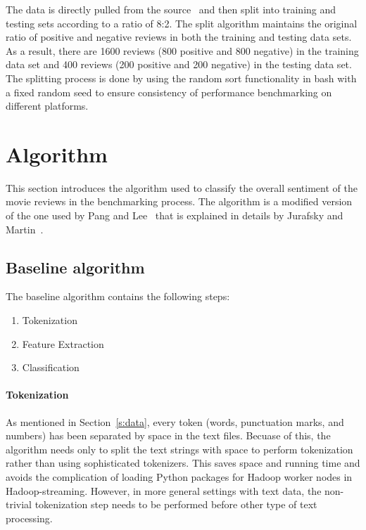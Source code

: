 The data is directly pulled from the
source~\cite{hid-sp18-405-sentiment-data} and then split into training
and testing sets according to a ratio of 8:2. The split algorithm
maintains the original ratio of positive and negative reviews in both
the training and testing data sets. As a result, there are 1600
reviews (800 positive and 800 negative) in the training data set and
400 reviews (200 positive and 200 negative) in the testing data
set. The splitting process is done by using the random sort
functionality in bash with a fixed random seed to ensure consistency
of performance benchmarking on different platforms.


\section{Algorithm}\label{s:algorithm}

This section introduces the algorithm used to classify the overall
sentiment of the movie reviews in the benchmarking process. The
algorithm is a modified version of the one used by Pang and
Lee~\cite{hid-sp18-405-sentiment-pang2004asentimental} that is
explained in details by Jurafsky and
Martin~\cite{hid-sp18-405-sentiment-jurafsky2009}.

\subsection{Baseline algorithm}\label{ss:base}

The baseline algorithm contains the following steps:

\begin{enumerate}
	\item Tokenization
	\item Feature Extraction
	\item Classification
\end{enumerate}

\paragraph{Tokenization}
As mentioned in Section~\ref{s:data}, every token (words, punctuation
marks, and numbers) has been separated by space in the text
files. Becuase of this, the algorithm needs only to split the text
strings with space to perform tokenization rather than using
sophisticated tokenizers. This saves space and running time and avoids
the complication of loading Python packages for Hadoop worker nodes in
Hadoop-streaming. However, in more general settings with text data,
the non-trivial tokenization step needs to be performed before other
type of text processing.

